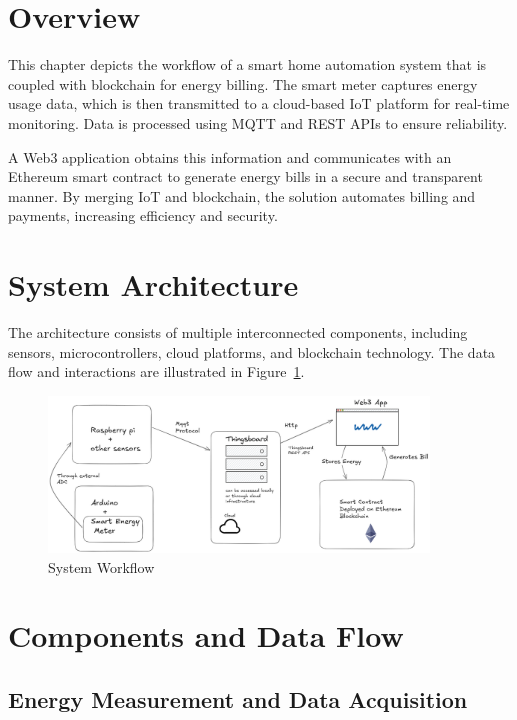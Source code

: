 \documentclass[a4paper,12pt]{report}
\begin{document}
\section{Overview}

This chapter depicts the workflow of a smart home automation system that is coupled with blockchain for energy billing.  The smart meter captures energy usage data, which is then transmitted to a cloud-based IoT platform for real-time monitoring\cite{jain2014raspberry}\cite{chaudhari2017smart}.  Data is processed using MQTT and REST APIs to ensure reliability\cite{Atmoko_2017}.

 A Web3 application obtains this information and communicates with an Ethereum smart contract to generate energy bills in a secure and transparent manner\cite{10.1145/3328833.3328857}\cite{Hu2018BlockchainbasedSC}.  By merging IoT and blockchain, the solution automates billing and payments, increasing efficiency and security.


\section{System Architecture}

The architecture consists of multiple interconnected components, including sensors, microcontrollers, cloud platforms, and blockchain technology. The data flow and interactions are illustrated in Figure~\ref{fig:workflow}.

\begin{figure}[h]
    \centering
    \includegraphics[width=0.9\textwidth]{basicArchitecture.png}
    \caption{System Workflow}
    \label{fig:workflow}
\end{figure}

\section{Components and Data Flow}

\subsection{Energy Measurement and Data Acquisition}
\end{document}
